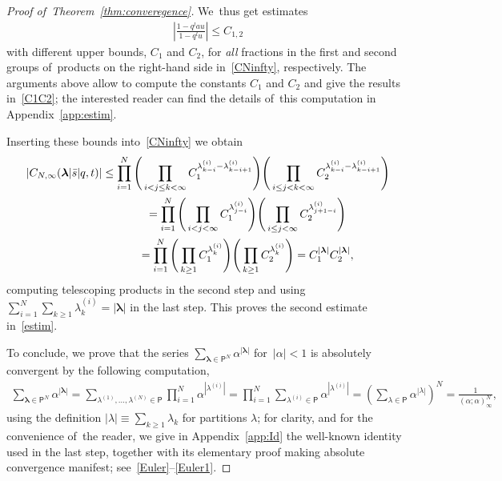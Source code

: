 \documentclass[11pt]{article}
\numberwithin{equation}{section}
\newcommand{\vlam}{\boldsymbol{\lambda}}
\newcommand{\bs}{\bar{s}}
\begin{document}
\begin{proof}[Proof of~Theorem~\ref{thm:converegence}]
We~thus get estimates
\begin{gather*}
\left|\frac{1-q^{l}au}{1-q^l u}\right| \leq C_{1,2}
\end{gather*}
with different upper bounds, $C_1$ and $C_2$, for {\em all} fractions in the first and second groups of~pro\-ducts on the right-hand side in~\eqref{CNinfty}, respectively.
The arguments above allow to compute the constants $C_1$ and $C_2$ and give the results in~\eqref{C1C2}; the interested reader can find the details of~this computation in Appendix~\ref{app:estim}.

Inserting these bounds into~\eqref{CNinfty} we obtain
\begin{gather}
|C_{N,\infty}(\vlam|\bs|q,t)| \leq
\prod_{i=1}^N \Bigg( \prod_{i< j\leq k< \infty} C_1^{\lambda^{(i)}_{k-i}-\lambda^{(i)}_{k-i+1}}\Bigg)\Bigg( \prod_{i\leq j< k< \infty} C_2^{\lambda^{(i)}_{k-i}-\lambda^{(i)}_{k-i+1}}\Bigg) \nonumber
\\ \hphantom{|C_{N,\infty}(\vlam|\bs|q,t)|}
{}= \prod_{i=1}^N \Bigg( \prod_{i< j< \infty} C_1^{\lambda^{(i)}_{j-i}}\Bigg)\Bigg( \prod_{i\leq j< \infty} C_2^{\lambda^{(i)}_{j+1-i}}\Bigg)\nonumber
\\ \hphantom{|C_{N,\infty}(\vlam|\bs|q,t)|}
{}= \prod_{i=1}^N \Bigg( \prod_{k\geq 1} C_1^{\lambda^{(i)}_{k}}\Bigg) \Bigg( \prod_{k\geq 1} C_2^{\lambda^{(i)}_{k}}\Bigg) = C_1^{|\vlam|}C_2^{|\vlam|},
\label{Cbound}
\end{gather}
computing telescoping products in the second step and using $\sum_{i=1}^N\sum_{k\geq 1}\lambda^{(i)}_k=|\vlam|$ in the last step.
This proves the second estimate in~\eqref{estim}.

To conclude, we prove that the series $\sum_{\vlam\in\mathsf{P}^N} \alpha^{|\vlam|}$ for~$|\alpha|<1$ is absolutely convergent by the following computation,
\begin{gather*}
\sum_{\vlam\in\mathsf{P}^N} \alpha^{|\vlam|} = \sum_{\lambda^{(1)},\dots,\lambda^{(N)}\in\mathsf{P}} \prod_{i=1}^N \alpha^{|\lambda^{(i)}|} =
 \prod_{i=1}^N \sum_{\lambda^{(i)}\in\mathsf{P}} \alpha^{|\lambda^{(i)}|} =\left( \sum_{\lambda\in\mathsf{P}} \alpha^{|\lambda|}\right)^N = \frac1{(\alpha;\alpha)_\infty^N},
\end{gather*}
using the definition $|\lambda|\equiv \sum_{k\geq 1}\lambda_k$ for partitions $\lambda$; for clarity, and for the convenience of~the reader, we give in Appendix~\ref{app:Id} the well-known identity used in the last step, together with its elementary proof making absolute convergence manifest; see~\eqref{Euler}--\eqref{Euler1}.
\end{proof}
\end{document}
